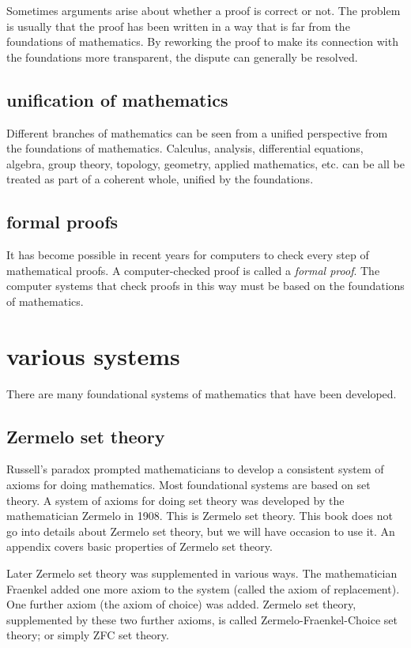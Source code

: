 \documentclass[cup9a]{cupbook}
\begin{document}
Sometimes arguments arise about whether a proof is correct or not.  The problem is usually that the proof has been written in a way that is far from the foundations of mathematics.  By reworking the proof to make its connection with the foundations more transparent, the dispute can generally be resolved.

\subsection{unification of mathematics}

Different branches of mathematics can be seen from a unified perspective from the foundations of mathematics.  Calculus, analysis, differential equations, algebra, group theory, topology, geometry, applied mathematics, etc. can be all be treated as part of a coherent whole, unified by the foundations.

\subsection{formal proofs}

It has become possible in recent years for computers to check every step of mathematical proofs.  A computer-checked proof is called a {\it formal proof}.  The computer systems that check proofs in this way must be based on the foundations of mathematics.

\section{various systems}

There are many foundational systems of mathematics that have been developed.

\subsection{Zermelo set theory}

Russell's paradox prompted mathematicians to develop a consistent system of axioms for doing mathematics.  Most foundational systems are based on set theory.  A system of axioms for doing set theory 
was developed by the mathematician Zermelo in 1908.   This is Zermelo set theory.  This book does not go into details about Zermelo set theory, but we will have occasion to use it.  An appendix covers basic properties of Zermelo set theory.

Later Zermelo set theory was supplemented in various ways.  The mathematician Fraenkel added one more axiom to the system (called the axiom of replacement).  One further axiom (the axiom of choice) was added.  Zermelo set theory, supplemented by these two further axioms, is called Zermelo-Fraenkel-Choice set theory; or simply ZFC set theory.
\end{document}
